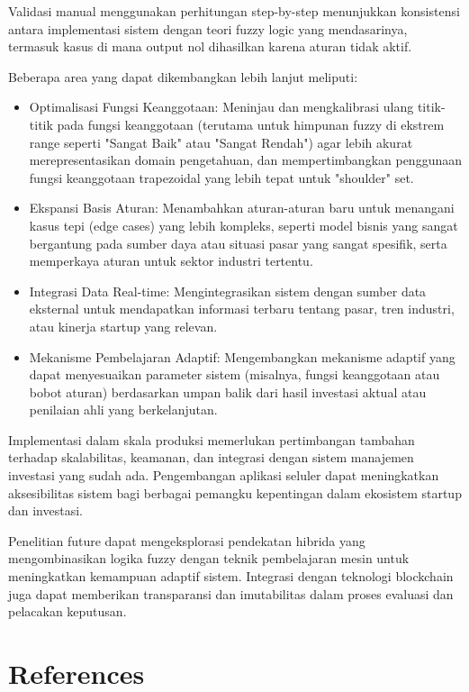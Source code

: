 \documentclass{article}
\begin{document}
Validasi manual menggunakan perhitungan step-by-step menunjukkan konsistensi antara implementasi sistem dengan teori fuzzy logic yang mendasarinya, termasuk kasus di mana output nol dihasilkan karena aturan tidak aktif.

Beberapa area yang dapat dikembangkan lebih lanjut meliputi:
\begin{itemize}
    \item Optimalisasi Fungsi Keanggotaan: Meninjau dan mengkalibrasi ulang titik-titik pada fungsi keanggotaan (terutama untuk himpunan fuzzy di ekstrem range seperti "Sangat Baik" atau "Sangat Rendah") agar lebih akurat merepresentasikan domain pengetahuan, dan mempertimbangkan penggunaan fungsi keanggotaan trapezoidal yang lebih tepat untuk "shoulder" set.
    \item Ekspansi Basis Aturan: Menambahkan aturan-aturan baru untuk menangani kasus tepi (edge cases) yang lebih kompleks, seperti model bisnis yang sangat bergantung pada sumber daya atau situasi pasar yang sangat spesifik, serta memperkaya aturan untuk sektor industri tertentu.
    \item Integrasi Data Real-time: Mengintegrasikan sistem dengan sumber data eksternal untuk mendapatkan informasi terbaru tentang pasar, tren industri, atau kinerja startup yang relevan.
    \item Mekanisme Pembelajaran Adaptif: Mengembangkan mekanisme adaptif yang dapat menyesuaikan parameter sistem (misalnya, fungsi keanggotaan atau bobot aturan) berdasarkan umpan balik dari hasil investasi aktual atau penilaian ahli yang berkelanjutan.
\end{itemize}
Implementasi dalam skala produksi memerlukan pertimbangan tambahan terhadap skalabilitas, keamanan, dan integrasi dengan sistem manajemen investasi yang sudah ada. Pengembangan aplikasi seluler dapat meningkatkan aksesibilitas sistem bagi berbagai pemangku kepentingan dalam ekosistem startup dan investasi.

Penelitian future dapat mengeksplorasi pendekatan hibrida yang mengombinasikan logika fuzzy dengan teknik pembelajaran mesin untuk meningkatkan kemampuan adaptif sistem. Integrasi dengan teknologi blockchain juga dapat memberikan transparansi dan imutabilitas dalam proses evaluasi dan pelacakan keputusan.

\section{References}
\end{document}
